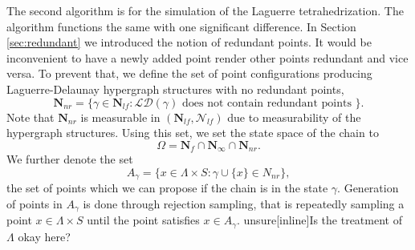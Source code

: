 The second algorithm is for the simulation of the Laguerre tetrahedrization. The algorithm functions the same with one significant difference. In Section \ref{sec:redundant} we introduced the notion of redundant points. It would be inconvenient to have a newly added point render other points redundant and vice versa. To prevent that, we define the set of point configurations producing Laguerre-Delaunay hypergraph structures with no redundant points,
$$\mathbf N_{nr} = \{ \gamma \in \mathbf N_{lf}: \mathcal {LD}(\gamma) \text{ does not contain redundant points }\}.$$ 
Note that $\mathbf N_{nr}$ is  measurable in $(\mathbf N_{lf}, \mathcal N_{lf})$ due to measurability of the hypergraph structures.  Using this set, we set the state space of the chain to
$$\Omega = \mathbf N_f \cap \mathbf N_\infty \cap \mathbf N_{nr}.$$
We further denote the set 
$$A_\gamma = \{ x \in \Lambda \times S: \gamma\cup\{x\} \in N_{nr}\},$$
the set of points which we can propose if the chain is in the state $\gamma$. Generation of points in $A_\gamma$ is done through rejection sampling, that is repeatedly sampling a point $x\in \Lambda\times S$ until the point satisfies $x\in A_\gamma$.
unsure[inline]{Is the treatment of $\Lambda$ okay here?}

